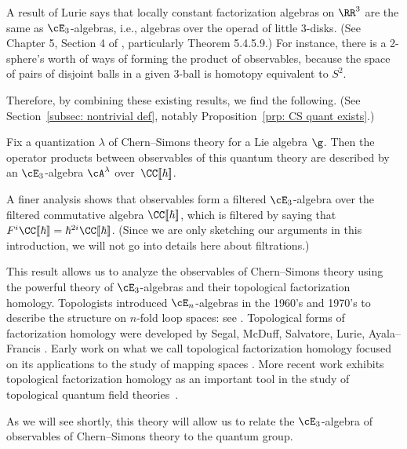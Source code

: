 \documentclass[10pt]{amsart}
\begin{document}
A result of Lurie \cite{LurHA} says that locally constant factorization algebras on $\RR^3$ are the same as $\cE_3$-algebras,
i.e., algebras over the operad of little 3-disks.  (See Chapter 5, Section 4 of \cite{LurHA}, particularly Theorem 5.4.5.9.)    For instance, there is a 2-sphere's worth of ways of forming the product of observables, because the space of pairs of disjoint balls in a given 3-ball is homotopy equivalent to $S^2$.  

Therefore, by combining these existing results, we find the following. 
(See Section~\ref{subsec: nontrivial def}, notably Proposition~\ref{prp: CS quant exists}.)

\begin{prp*}
Fix a quantization $\lambda$ of Chern--Simons theory for a Lie algebra $\g$.  
Then the operator products between observables of this quantum theory are described by an $\cE_3$-algebra $\cA^\lambda$ over~$\CC[\![\hbar]\!]$. 
\end{prp*}

A finer analysis shows that observables form a filtered $\cE_3$-algebra  over the filtered commutative algebra $\CC[\![\hbar]\!]$, 
which is filtered by saying that $F^i \CC[\![\hbar]\!] = \hbar^{2i} \CC[\![\hbar]\!]$.  
(Since we are only sketching our arguments in this introduction, 
we will not go into details here about filtrations.)

This result allows us to analyze the observables of Chern--Simons theory using the powerful theory of $\cE_3$-algebras and their topological factorization homology.  
Topologists introduced $\cE_n$-algebras in the 1960's and 1970's to describe the structure on $n$-fold loop spaces: see \cite{BoaVogAMS,BoaVogLNM,MayLoop}.  
Topological forms of factorization homology were developed by Segal, McDuff, Salvatore, Lurie, Ayala--Francis \cite{Segal,McDuff,SalCS,LurHA,AF}.  
Early work on what we call topological factorization homology focused on its applications to the study of mapping spaces \cite{LurHA}.  
More recent work exhibits topological factorization homology as an important tool in the study of topological quantum field theories~\cite{LurTFT,AF,Sch,BBJ1,BBJ2}.

As we will see shortly, this theory will allow us to relate the $\cE_3$-algebra of observables of Chern--Simons theory to the quantum group.  
\end{document}
